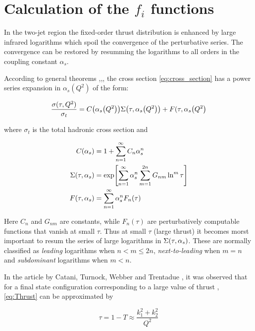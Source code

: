 \documentclass[../main.tex]{subfiles}
\begin{document}

\section{Calculation of the $f_i$ functions}\label{sec:f functions}


In the two-jet region the fixed-order thrust distribution is enhanced by large infrared
logarithms which spoil the convergence of the perturbative series. The convergence can be
restored by resumming the logarithms to all orders in the coupling constant $\alpha_s$.

According to general theorems \cite{Block:1937},\cite{Kinoshita:1962ur},\cite{Lee:1964is}, 
the cross section \cref{eq:cross_section} has a power series expansion in $\alpha_s(Q^2)$ of the form:

\begin{equation}
    \frac{\sigma(\tau,Q^2)}{\sigma_t} =  C\qty(\alpha_s\qty(Q^2))\Sigma\qty(\tau,\alpha_s\qty(Q^2))+F(\tau,\alpha_s\qty(Q^2)
\end{equation}

where $\sigma_t$ is the total hadronic cross section and    


\begin{subequations}
\begin{align}
    C\qty(\alpha_s) &= 1 + \sum_{n=1}^{\infty} C_n \alpha_s^n \\
    \Sigma\qty(\tau,\alpha_s)&= \exp[\sum_{n=1}^\infty \alpha_s^n \sum_{m=1}^{2n}G_{nm}\ln^m\tau] \\
    F(\tau,\alpha_s) &= \sum_{n=1}^{\infty} \alpha_s^n F_n(\tau)
\end{align}
\end{subequations}

Here $C_n$ and $G_{nm}$ are constants, while $F_n(\tau)$ are perturbatively computable functions that vanish at small $\tau$.
Thus at small $\tau$ (large thrust) it becomes morst important to resum the series of large logarithms in $\Sigma\qty(\tau,\alpha_s)$.
These are normally classified as \emph{leading} logarithms when $n < m \le 2n$, \emph{next-to-leading} when $m = n$ 
and \emph{subdominant} logarithms when $m < n$. 

In the article by Catani, Turnock, Webber and Trentadue \cite{CATANI1991491}, it was observed that 
for a final state configuration corresponding to a large value of thrust , \cref{eq:Thrust} can be approximated by

\begin{equation}
    \tau = 1-T \approx \frac{k_1^2+k_2^2}{Q^2}
\end{equation}
\end{document}
